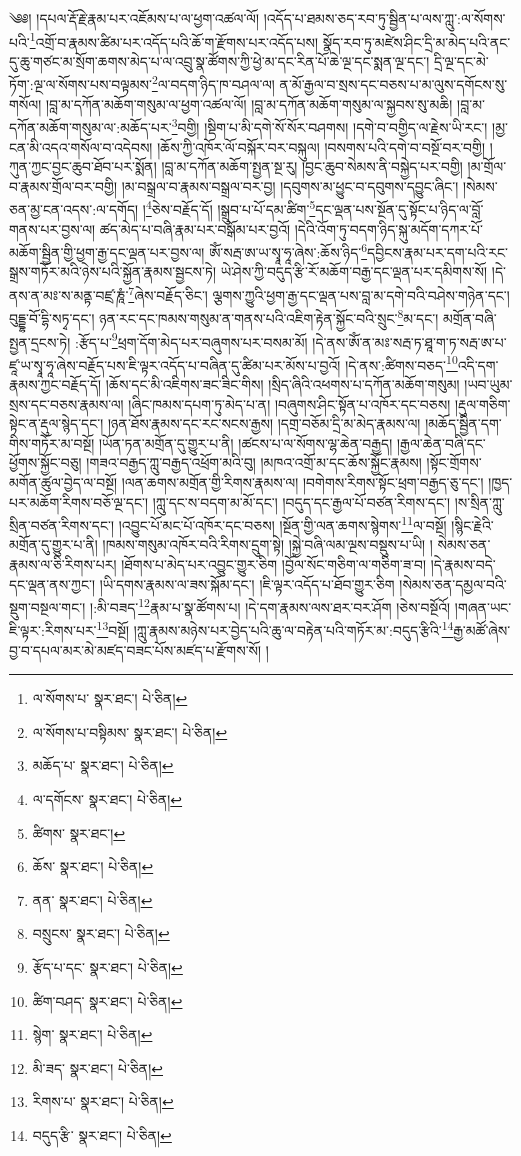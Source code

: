 \setcounter{footnote}{0} 
༄༅། །དཔལ་རྡོ་རྗེ་རྣམ་པར་འཇོམས་པ་ལ་ཕྱག་འཚལ་ལོ། །འདོད་པ་ཐམས་ཅད་རབ་ཏུ་སྦྱིན་པ་ལས་ཀླུ་:ལ་སོགས་པའི་\footnote{ལ་སོགས་པ་  སྣར་ཐང་།  པེ་ཅིན། }འགྲོ་བ་རྣམས་ཚིམ་པར་འདོད་པའི་ཆོ་ག་རྫོགས་པར་འདོད་པས། སྣོད་རབ་ཏུ་མཛེས་ཤིང་དྲི་མ་མེད་པའི་ནང་དུ་ཆུ་གཙང་མ་སྲོག་ཆགས་མེད་པ་ལ་འབྲུ་སྣ་ཚོགས་ཀྱི་ཕྱེ་མ་དང་རིན་པོ་ཆེ་ལྔ་དང་སྨན་ལྔ་དང་། དྲི་ལྔ་དང་མེ་ཏོག་:ལྔ་ལ་སོགས་པས་བལྟམས་\footnote{ལ་སོགས་པ་བསྟིམས་  སྣར་ཐང་།  པེ་ཅིན། }ལ་བདག་ཉིད་ཁ་བཤལ་ལ། ན་མོ་རྒྱལ་བ་སྲས་དང་བཅས་པ་མ་ལུས་དགོངས་སུ་གསོལ། །བླ་མ་དཀོན་མཆོག་གསུམ་ལ་ཕྱག་འཚལ་ལོ། །བླ་མ་དཀོན་མཆོག་གསུམ་ལ་སྐྱབས་སུ་མཆི། །བླ་མ་དཀོན་མཆོག་གསུམ་ལ་:མཆོད་པར་\footnote{མཆོད་པ་  སྣར་ཐང་།  པེ་ཅིན། }བགྱི། །སྡིག་པ་མི་དགེ་སོ་སོར་བཤགས། །དགེ་བ་བགྱིད་ལ་རྗེས་ཡི་རང་། །མྱ་ངན་མི་འདའ་གསོལ་བ་འདེབས། །ཆོས་ཀྱི་འཁོར་ལོ་བསྐོར་བར་བསྐུལ། །བསགས་པའི་དགེ་བ་བསྔོ་བར་བགྱི། །ཀུན་ཀྱང་བྱང་ཆུབ་ཐོབ་པར་སྨོན། །བླ་མ་དཀོན་མཆོག་སྤྱན་སྔ་རུ། །བྱང་ཆུབ་སེམས་ནི་བསྐྱེད་པར་བགྱི། །མ་གྲོལ་བ་རྣམས་གྲོལ་བར་བགྱི། །མ་བསྒྲལ་བ་རྣམས་བསྒྲལ་བར་བྱ། །དབུགས་མ་ཕྱུང་བ་དབུགས་དབྱུང་ཞིང་། །སེམས་ཅན་མྱ་ངན་འདས་:ལ་དགོད། །\footnote{ལ་དགོངས་  སྣར་ཐང་།  པེ་ཅིན། }ཅེས་བརྗོད་དོ། །སྒྲུབ་པ་པོ་དམ་ཚིག་\footnote{ཚིགས་  སྣར་ཐང་། }དང་ལྡན་པས་སྔོན་དུ་སྟོང་པ་ཉིད་ལ་བློ་གནས་པར་བྱས་ལ། ཚད་མེད་པ་བཞི་རྣམ་པར་བསྒོམ་པར་བྱའོ། །དེའི་འོག་ཏུ་བདག་ཉིད་སྐུ་མདོག་དཀར་པོ་མཆོག་སྦྱིན་གྱི་ཕྱག་རྒྱ་དང་ལྡན་པར་བྱས་ལ། ཨོཾ་སརྦ་ཨ་ཡ་སྭཱ་ཧཱ་ཞེས་:ཆོས་ཉིད་\footnote{ཆོས་  སྣར་ཐང་།  པེ་ཅིན། }དབྱིངས་རྣམ་པར་དག་པའི་རང་སྒྲས་གཏོར་མའི་ཉེས་པའི་སྐྱོན་རྣམས་སྦྱངས་ཏེ། ཡེ་ཤེས་ཀྱི་བདུད་རྩི་རོ་མཆོག་བརྒྱ་དང་ལྡན་པར་དམིགས་སོ། །དེ་ནས་ན་མཿ་ས་མནྟ་བཛྲ་ཎཱཾ་\footnote{ནན་  སྣར་ཐང་།  པེ་ཅིན། }ཞེས་བརྗོད་ཅིང་། ལྕགས་ཀྱུའི་ཕྱག་རྒྱ་དང་ལྡན་པས་བླ་མ་དགེ་བའི་བཤེས་གཉེན་དང་། བུདྡྷ་བོ་དྷི་སཏྭ་དང་། ཉན་རང་དང་ཁམས་གསུམ་ན་གནས་པའི་འཇིག་རྟེན་སྐྱོང་བའི་སྲུང་\footnote{བསྲུངས་  སྣར་ཐང་།  པེ་ཅིན། }མ་དང་། མགྲོན་བཞི་སྤྱན་དྲངས་ཏེ། :རྩོད་པ་\footnote{རྩོད་པ་དང་  སྣར་ཐང་།  པེ་ཅིན། }ཕྲག་དོག་མེད་པར་བཞུགས་པར་བསམ་མོ། །དེ་ནས་ཨོཾ་ན་མཿ་སརྦ་ཏ་ཐཱ་ག་ཏ་སརྦ་ཨ་པ་ཛཱ་ཡ་སྭཱ་ཧཱ་ཞེས་བརྗོད་པས་ཇི་ལྟར་འདོད་པ་བཞིན་དུ་ཚིམ་པར་མོས་པ་བྱའོ། །དེ་ནས་:ཚིགས་བཅད་\footnote{ཚིག་བཤད་  སྣར་ཐང་།  པེ་ཅིན། }འདི་དག་རྣམས་ཀྱང་བརྗོད་དོ། །ཆོས་དང་མི་འཇིགས་ཟང་ཟིང་གིས། །སྲིད་ཞིའི་འཕགས་པ་དཀོན་མཆོག་གསུམ། །ཡབ་ཡུམ་སྲས་དང་བཅས་རྣམས་ལ། །ཞིང་ཁམས་དཔག་ཏུ་མེད་པ་ན། །བཞུགས་ཤིང་སྟོན་པ་འཁོར་དང་བཅས། །རྡུལ་གཅིག་སྟེང་ན་རྡུལ་སྙེད་དང་། །ཉན་ཐོས་རྣམས་དང་རང་སངས་རྒྱས། །དགྲ་བཅོམ་དྲི་མ་མེད་རྣམས་ལ། །མཆོད་སྦྱིན་དག་གིས་གཏོར་མ་བསྔོ། །ཡོན་ཏན་མགྲོན་དུ་གྱུར་པ་ནི། །ཚངས་པ་ལ་སོགས་ལྷ་ཆེན་བརྒྱད། །རྒྱལ་ཆེན་བཞི་དང་ཕྱོགས་སྐྱོང་བཅུ། །གཟའ་བརྒྱད་ཀླུ་བརྒྱད་འཕྲོག་མའི་བུ། །མཁའ་འགྲོ་མ་དང་ཆོས་སྐྱོང་རྣམས། །སྟོང་གྲོགས་མགོན་ཚུལ་བྱེད་ལ་བསྔོ། །ལན་ཆགས་མགྲོན་གྱི་རིགས་རྣམས་ལ། །བགེགས་རིགས་སྟོང་ཕྲག་བརྒྱད་ཅུ་དང་། །ཁྱད་པར་མཆོག་རིགས་བཅོ་ལྔ་དང་། །ཀླུ་དང་ས་བདག་མ་མོ་དང་། །བདུད་དང་རྒྱལ་པོ་བཙན་རིགས་དང་། །ས་སྲིན་ཀླུ་སྲིན་བཙན་རིགས་དང་། །འབྱུང་པོ་མང་པོ་འཁོར་དང་བཅས། །སྔོན་གྱི་ལན་ཆགས་སྙེགས་\footnote{སྙེག་  སྣར་ཐང་།  པེ་ཅིན། }ལ་བསྔོ། །སྙིང་རྗེའི་མགྲོན་དུ་གྱུར་པ་ནི། །ཁམས་གསུམ་འཁོར་བའི་རིགས་དྲུག་སྟེ། །སྐྱེ་བཞི་ལམ་ལྔས་བསྡུས་པ་ཡི། །
སེམས་ཅན་རྣམས་ལ་ཅི་རིགས་པར། །ཐོགས་པ་མེད་པར་འབྱུང་གྱུར་ཅིག །བྱོལ་སོང་གཅིག་ལ་གཅིག་ཟ་བ། །དེ་རྣམས་བདེ་དང་ལྡན་ནས་ཀྱང་། །ཡི་དགས་རྣམས་ལ་ཟས་སྐོམ་དང་། །ཇི་ལྟར་འདོད་པ་ཐོབ་གྱུར་ཅིག །སེམས་ཅན་དམྱལ་བའི་སྡུག་བསྔལ་གང་། །:མི་བཟད་\footnote{མི་ཟད་  སྣར་ཐང་།  པེ་ཅིན། }རྣམ་པ་སྣ་ཚོགས་པ། །དེ་དག་རྣམས་ལས་ཐར་བར་ཤོག །ཅེས་བསྔོའོ། །གཞན་ཡང་ཇི་ལྟར་:རིགས་པར་\footnote{རིགས་པ་  སྣར་ཐང་།  པེ་ཅིན། }བསྔོ། །ཀླུ་རྣམས་མཉེས་པར་བྱེད་པའི་ཆུ་ལ་བརྟེན་པའི་གཏོར་མ་:བདུད་རྩིའི་\footnote{བདུད་རྩི་  སྣར་ཐང་།  པེ་ཅིན། }རྒྱ་མཚོ་ཞེས་བྱ་བ་དཔལ་མར་མེ་མཛད་བཟང་པོས་མཛད་པ་རྫོགས་སོ། །